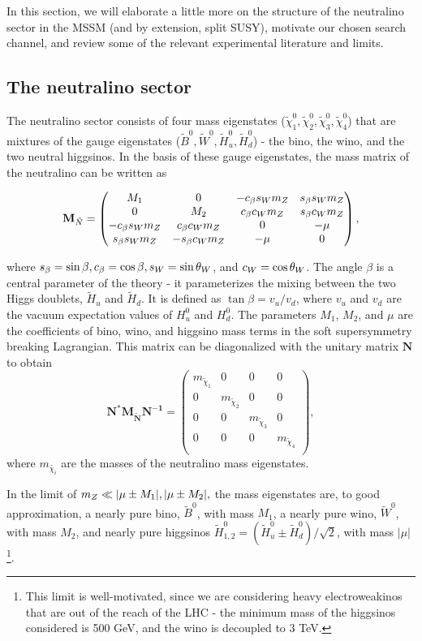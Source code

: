In this section, we will elaborate a little more on the structure of the neutralino sector in the MSSM (and by extension, split SUSY), motivate our chosen search channel, and review some of the relevant experimental literature and limits.

\subsection{The neutralino sector}
The neutralino sector consists of four mass eigenstates ($\tilde{\chi}_1^0,\tilde{\chi}_2^0,\tilde{\chi}_3^0,\tilde{\chi}_4^0$)  that are mixtures of the gauge eigenstates ($\tilde{B}^0,\tilde{W}^0,\tilde{H}_u^0,\tilde{H}^0_d$) - the bino, the wino, and the two neutral higgsinos. In the basis of these gauge eigenstates, the mass matrix of the neutralino can be written as

\[\mathbf{M}_{\tilde{N}}=
\begin{pmatrix}
  M_1 & 0 & -c_\beta s_Wm_Z & s_\beta s_Wm_Z \\
  0 & M_2 & c_\beta c_Wm_Z & s_\beta c_Wm_Z \\
  -c_\beta s_Wm_Z & c_\beta c_Wm_Z & 0 & -\mu \\
  s_\beta s_Wm_Z & -s_\beta c_Wm_Z & -\mu & 0
\end{pmatrix},\]

\noindent where $s_\beta = \sin\beta, c_\beta = \cos\beta, s_W = \sin\theta_{W}$,  and  $c_W = \cos\theta_W$. The angle $\beta$ is a central parameter of the theory - it parameterizes the mixing between the two Higgs doublets, $\tilde{H}_u$ and $\tilde{H}_d$. It is defined as $\tan\beta = v_u/v_d$, where $v_u$ and $v_d$ are the vacuum expectation values of $H_u^0$ and $H_d^0$. The parameters $M_1$, $M_2$, and $\mu$ are the coefficients of bino, wino, and higgsino mass terms in the soft supersymmetry breaking Lagrangian.
This matrix can be diagonalized with the unitary matrix $\mathbf{N}$ to obtain 
\[\mathbf{N^*M_{\tilde{N}}N^{-1}} =
\begin{pmatrix}
  m_{\tilde{\chi}_1} & 0 & 0 & 0\\
  0 & m_{\tilde{\chi}_2} & 0 & 0 \\
  0 & 0 & m_{\tilde{\chi}_3} & 0 \\
  0 & 0 & 0 &  m_{\tilde{\chi}_4} \\
\end{pmatrix},
\]
where $m_{\tilde{\chi_i}}$ are the masses of the neutralino mass eigenstates. 

In the limit of $m_Z \ll |\mu\pm M_1|, |\mu\pm M_2|,$ the mass eigenstates are, to good approximation, a nearly pure bino, $\tilde{B}^0$, with mass $M_1$, a nearly pure wino, $\tilde{W}^0$, with mass $M_2$, and nearly pure higgsinos $\tilde{H}^0_{1,2} = (\tilde{H}_u^0 \pm \tilde{H}_d^0)/\sqrt{2}$, with mass $|\mu|$\footnote{This limit is well-motivated, since we are considering heavy electroweakinos that are out of the reach of the LHC - the minimum mass of the higgsinos considered is 500 GeV, and the wino is decoupled to 3 TeV.}. 

